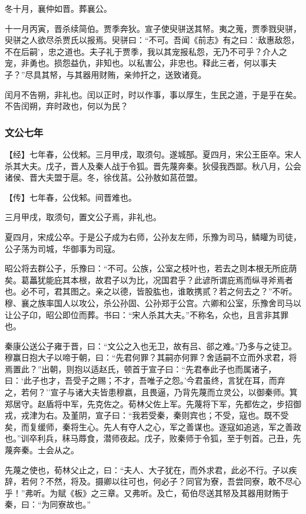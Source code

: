 \documentclass[]{article}
\begin{document}
冬十月，襄仲如晋。葬襄公。

十一月丙寅，晋杀续简伯。贾季奔狄。宣子使臾骈送其帑。夷之蒐，贾季戮臾骈，臾骈之人欲尽杀贾氏以报焉。臾骈曰：``不可。吾闻《前志》有之曰：`敌惠敌怨，不在后嗣'，忠之道也。夫子礼于贾季，我以其宠报私怨，无乃不可乎？介人之宠，非勇也。损怨益仇，非知也。以私害公，非忠也。释此三者，何以事夫子？''尽具其帑，与其器用财贿，亲帅扞之，送致诸竟。

闰月不告朔，非礼也。闰以正时，时以作事，事以厚生，生民之道，于是乎在矣。不告闰朔，弃时政也，何以为民？

\hypertarget{header-n1122}{%
\subsubsection{文公七年}\label{header-n1122}}

【经】七年春，公伐邾。三月甲戌，取须句。遂城郚。夏四月，宋公王臣卒。宋人杀其大夫。戊子，晋人及秦人战于令狐。晋先蔑奔秦。狄侵我西鄙。秋八月，公会诸侯、晋大夫盟于扈。冬，徐伐莒。公孙敖如莒莅盟。

【传】七年春，公伐邾。间晋难也。

三月甲戌，取须句，置文公子焉，非礼也。

夏四月，宋成公卒。于是公子成为右师，公孙友左师，乐豫为司马，鳞矔为司徒，公子荡为司城，华御事为司寇。

昭公将去群公子，乐豫曰：``不可。公族，公室之枝叶也，若去之则本根无所庇荫矣。葛藟犹能庇其本根，故君子以为比，况国君乎？此谚所谓庇焉而纵寻斧焉者也。必不可，君其图之。亲之以德，皆股肱也，谁敢携贰？若之何去之？''不听。穆、襄之族率国人以攻公，杀公孙固、公孙郑于公宫。六卿和公室，乐豫舍司马以让公子卬，昭公即位而葬。书曰：``宋人杀其大夫。''不称名，众也，且言非其罪也。

秦康公送公子雍于晋，曰：``文公之入也无卫，故有吕、郤之难。''乃多与之徒卫。穆赢日抱大子以啼于朝，曰：``先君何罪？其嗣亦何罪？舍适嗣不立而外求君，将焉置此？''出朝，则抱以适赵氏，顿首于宣子曰：``先君奉此子也而属诸子，曰：`此子也才，吾受子之赐；不才，吾唯子之怨。'今君虽终，言犹在耳，而弃之，若何？''宣子与诸大夫皆患穆嬴，且畏逼，乃背先蔑而立灵公，以御秦师。箕郑居守。赵盾将中军，先克佐之。荀林父佐上军。先蔑将下军，先都佐之，步招御戎，戎津为右。及堇阴，宣子曰：``我若受秦，秦则宾也；不受，寇也。既不受矣，而复缓师，秦将生心。先人有夺人之心，军之善谋也。逐寇如追逃，军之善政也。''训卒利兵，秣马蓐食，潜师夜起。戊子，败秦师于令狐，至于刳首。己丑，先蔑奔秦。士会从之。

先蔑之使也，荀林父止之，曰：``夫人、大子犹在，而外求君，此必不行。子以疾辞，若何？不然，将及。摄卿以往可也，何必子？同官为寮，吾尝同寮，敢不尽心乎！''弗听。为赋《板》之三章。又弗听。及亡，荀伯尽送其帑及其器用财贿于秦，曰：``为同寮故也。''
\end{document}

